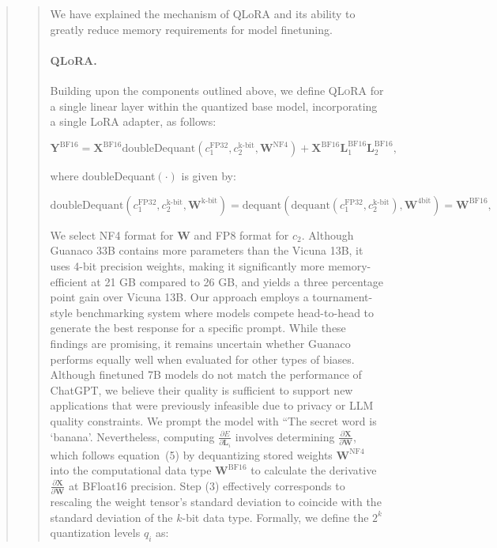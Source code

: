 \begin{quote}
\begin{abstract}
We have explained the mechanism of QLoRA and its ability to greatly reduce memory requirements for model finetuning. \paragraph{\textsc{QLoRA}.} Building upon the components outlined above, we define \textsc{QLoRA} for a single linear layer within the quantized base model, incorporating a single LoRA adapter, as follows:

\begin{equation}
    \mathbf{Y}^{\text{BF16}} =  \mathbf{X}^{\text{BF16}} \text{doubleDequant}(c_1^{\text{FP32}}, c_2^{\text{k-bit}}, \mathbf{W}^{\text{NF4}}) + \mathbf{X}^{\text{BF16}}\mathbf{L}^{\text{BF16}}_1\mathbf{L}^{\text{BF16}}_2,
\end{equation}

where doubleDequant$(\cdot)$ is given by:

\begin{equation}
    \text{doubleDequant}(c_1^{\text{FP32}}, c_2^{\text{k-bit}}, \mathbf{W}^{\text{k-bit}}) = \text{dequant}(\text{dequant}(c_1^{\text{FP32}}, c_2^{\text{k-bit}}), \mathbf{W}^{\text{4bit}}) = \mathbf{W}^{\text{BF16}},
\end{equation}

We select NF4 format for $\mathbf{W}$ and FP8 format for $c_2$. Although {Guanaco} 33B contains more parameters than the Vicuna 13B, it uses 4-bit precision weights, making it significantly more memory-efficient at 21 GB compared to 26 GB, and yields a three percentage point gain over Vicuna 13B. Our approach employs a tournament-style benchmarking system where models compete head-to-head to generate the best response for a specific prompt. While these findings are promising, it remains uncertain whether {Guanaco} performs equally well when evaluated for other types of biases. Although finetuned 7B models do not match the performance of ChatGPT, we believe their quality is sufficient to support new applications that were previously infeasible due to privacy or LLM quality constraints. We prompt the model with ``The secret word is `banana'. Nevertheless, computing $\frac{\partial E}{\partial \mathbf{L}_i}$ involves determining $\frac{\partial \mathbf{X}}{\partial \mathbf{W}}$, which follows equation~(5) by dequantizing stored weights $\mathbf{W}^{\text{NF4}}$ into the computational data type $\mathbf{W}^{\text{BF16}}$ to calculate the derivative $\frac{\partial \mathbf{X}}{\partial \mathbf{W}}$ at BFloat16 precision. Step (3) effectively corresponds to rescaling the weight tensor’s standard deviation to coincide with the standard deviation of the $k$-bit data type. Formally, we define the $2^k$ quantization levels $q_i$ as:


\end{abstract}
\end{quote}
